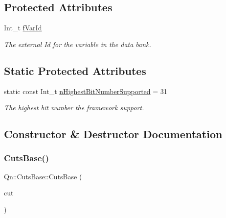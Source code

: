\subsection*{Protected Attributes}
\begin{DoxyCompactItemize}
\item 
\mbox{\label{classQn_1_1CutsBase_a9015a1d598b82d725128c027c6739715}} 
Int\+\_\+t \mbox{\hyperlink{classQn_1_1CutsBase_a9015a1d598b82d725128c027c6739715}{f\+Var\+Id}}
\begin{DoxyCompactList}\small\item\em The external Id for the variable in the data bank. \end{DoxyCompactList}\end{DoxyCompactItemize}
\subsection*{Static Protected Attributes}
\begin{DoxyCompactItemize}
\item 
\mbox{\label{classQn_1_1CutsBase_a2fe9ccf5025f6d78b3a45a4d8202584e}} 
static const Int\+\_\+t \mbox{\hyperlink{classQn_1_1CutsBase_a2fe9ccf5025f6d78b3a45a4d8202584e}{n\+Highest\+Bit\+Number\+Supported}} = 31
\begin{DoxyCompactList}\small\item\em The highest bit number the framework support. \end{DoxyCompactList}\end{DoxyCompactItemize}


\subsection{Constructor \& Destructor Documentation}
\mbox{\label{classQn_1_1CutsBase_a5b86fd2a224c93e313c545e926d30539}} 
\subsubsection{\texorpdfstring{Cuts\+Base()}{CutsBase()}\hspace{0.1cm}{\footnotesize\ttfamily [1/2]}}
{\footnotesize\ttfamily Qn\+::\+Cuts\+Base\+::\+Cuts\+Base (\begin{DoxyParamCaption}\item[{const \mbox{\hyperlink{classQn_1_1CutsBase}{Cuts\+Base}} \&}]{cut }\end{DoxyParamCaption})}

